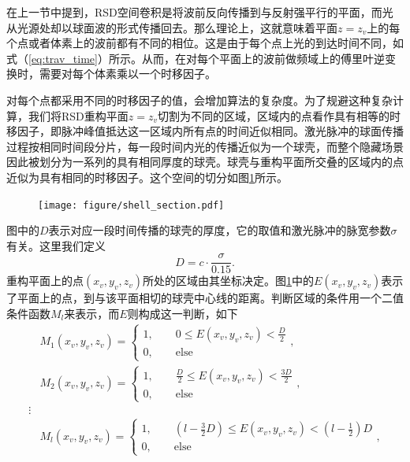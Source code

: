 \documentclass[master]{shtthesis}             %
\begin{document}
在上一节中提到，RSD空间卷积是将波前反向传播到与反射强平行的平面，而光从光源处却以球面波的形式传播回去。那么理论上，这就意味着平面$z=z_v$上的每个点或者体素上的波前都有不同的相位。这是由于每个点上光的到达时间不同，如式（\ref{eq:trav_time}）所示。从而，在对每个平面上的波前做频域上的傅里叶逆变换时，需要对每个体素乘以一个时移因子。

对每个点都采用不同的时移因子的值，会增加算法的复杂度。为了规避这种复杂计算，我们将RSD重构平面$z=z_v$切割为不同的区域，区域内的点看作具有相等的时移因子，即脉冲峰值抵达这一区域内所有点的时间近似相同。激光脉冲的球面传播过程按相同时间段分片，每一段时间内光的传播近似为一个球壳，而整个隐藏场景因此被划分为一系列的具有相同厚度的球壳。球壳与重构平面所交叠的区域内的点近似为具有相同的时移因子。这个空间的切分如图\ref{fig:shell_sect}所示。
\begin{figure}[!tb]
  \centering
  \texttt{[image: figure/shell\_section.pdf]}
  \label{fig:shell_sect}
\end{figure}  
图中的$D$表示对应一段时间传播的球壳的厚度，它的取值和激光脉冲的脉宽参数$\sigma$有关。这里我们定义
\begin{equation}
  D = c\cdot \frac{\sigma}{0.15} .
\end{equation}
重构平面上的点$(x_v,y_v,z_v)$所处的区域由其坐标决定。图\ref{fig:shell_sect}中的$E(x_v,y_v,z_v)$表示了平面上的点，到与该平面相切的球壳中心线的距离。判断区域的条件用一个二值条件函数$M_l$来表示，而$E$则构成这一判断，如下
\begin{equation}
  \begin{split}
    &M_1(x_v,y_v,z_v) = \begin{cases}
      1,\qquad 0 \leq E(x_v,y_v,z_v) < \frac{D}{2} \\
      0,\qquad \text{else} 
    \end{cases}, \\
    &M_2(x_v,y_v,z_v) = \begin{cases}
      1,\qquad \frac{D}{2} \leq E(x_v,y_v,z_v) < \frac{3D}{2} \\
      0,\qquad \text{else}
    \end{cases}, \\
    \vdots \\
    &M_l(x_v,y_v,z_v) = \begin{cases}
      1,\qquad (l-\frac{3}{2}D) \leq E(x_v,y_v,z_v) < (l-\frac{1}{2})D \\
      0,\qquad \text{else}
    \end{cases}, 
  \end{split}
\end{equation}
\end{document}
